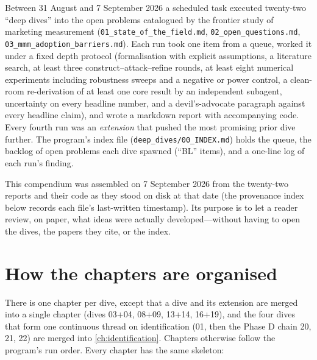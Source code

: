 Between 31 August and 7 September 2026 a scheduled task executed twenty-two ``deep dives'' into the open
problems catalogued by the frontier study of marketing measurement (\texttt{01\_state\_of\_the\_field.md},
\texttt{02\_open\_questions.md}, \texttt{03\_mmm\_adoption\_barriers.md}). Each run took one item from a queue,
worked it under a fixed depth protocol (formalisation with explicit assumptions, a literature search, at least
three construct--attack--refine rounds, at least eight numerical experiments including robustness sweeps and a
negative or power control, a clean-room re-derivation of at least one core result by an independent subagent,
uncertainty on every headline number, and a devil's-advocate paragraph against every headline claim), and wrote
a markdown report with accompanying code. Every fourth run was an \emph{extension} that pushed the most
promising prior dive further. The program's index file (\texttt{deep\_dives/00\_INDEX.md}) holds the queue,
the backlog of open problems each dive spawned (``BL'' items), and a one-line log of each run's finding.

This compendium was assembled on 7 September 2026 from the twenty-two reports and their code as they stood on
disk at that date (the provenance index below records each file's last-written timestamp). Its purpose is
to let a reader review, on paper, what ideas were actually developed---without having to open the dives, the
papers they cite, or the index.

\section*{How the chapters are organised}

There is one chapter per dive, except that a dive and its extension are merged into a single chapter
(dives 03+04, 08+09, 13+14, 16+19), and the four dives that form one continuous thread on identification
(01, then the Phase D chain 20, 21, 22) are merged into \cref{ch:identification}. Chapters otherwise follow
the program's run order. Every chapter has the same skeleton:

